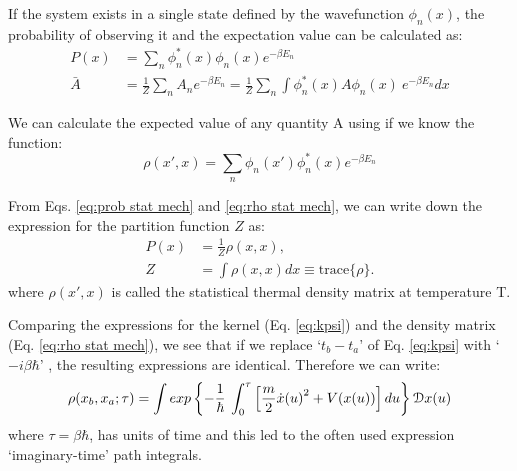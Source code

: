             If the system exists in a single state defined by the wavefunction $\phi_n(x)$, the probability of observing it and the expectation value can be calculated as: 
            \begin{equation}
                \label{eq:prob stat mech}
                \begin{aligned}
                    P(x) &= \displaystyle\sum\limits_n \phi_n^*(x) \phi_n(x) e^{-\beta E_n}\\
                    \bar{A} &= \displaystyle \frac{1}{Z} \displaystyle\sum\limits_n A_n e^{-\beta E_n} = \frac{1}{Z} \displaystyle\sum\limits_n \int \phi_n^*(x) A \phi_n(x)\: e^{-\beta E_n} dx
                \end{aligned}
            \end{equation}

            We can calculate the expected value of any quantity A using if we know the function:
            \begin{equation}
                \label{eq:rho stat mech}
                \rho(x',x) = \displaystyle \sum\limits_n \phi_n(x') \phi_n^*(x) e^{-\beta E_n}
            \end{equation}
            
            From Eqs. \eqref{eq:prob stat mech} and \eqref{eq:rho stat mech}, we can write down the expression for the partition function $Z$ as:
            \begin{equation}
                \begin{aligned}
                    P(x) &= \frac{1}{Z} \rho(x,x),\\
                    Z &= \int \rho(x,x) dx \equiv \text{trace} \{\rho\}.
                \end{aligned}
            \end{equation}
            where $\rho(x',x)$ is called the statistical thermal density matrix at temperature T.
            
            Comparing the expressions for the kernel (Eq. \eqref{eq:kpsi}) and the density matrix (Eq. \eqref{eq:rho stat mech}), we see that if we replace `$t_b - t_a$' of Eq. \eqref{eq:kpsi} with `$-i \beta \hbar$' , the resulting expressions are identical. Therefore we can write:
            \begin{equation}
                \rho (x_b, x_a; \tau) = \displaystyle \int exp \left\{ - \frac{1}{\hbar} \: \int_0^{\tau} \left[ \frac{m}{2} {\dot{x}(u)}^2 + V(x(u)) \right] du \right\} \mathcal{D}x(u)
            \end{equation}
            where $\tau = \beta \hbar$, has units of time and this led to the often used expression `imaginary-time' path integrals. 
            
